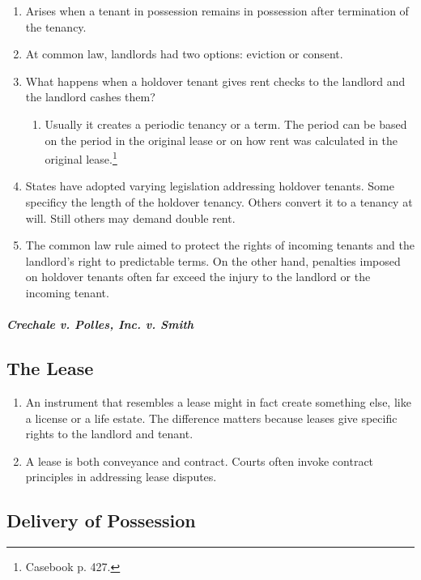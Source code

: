 \begin{enumerate}
    \item Arises when a tenant in possession remains in possession after 
    termination of the tenancy.
    \item At common law, landlords had two options: eviction or consent.
    \item What happens when a holdover tenant gives rent checks to the 
    landlord and the landlord cashes them?
    \begin{enumerate}
        \item Usually it creates a periodic tenancy or a term. The period can 
        be based on the period in the original lease or on how rent was 
        calculated in the original lease.\footnote{Casebook p. 427.}
    \end{enumerate}
    \item States have adopted varying legislation addressing holdover tenants. 
    Some specificy the length of the holdover tenancy. Others convert it to a 
    tenancy at will. Still others may demand double rent.
    \item The common law rule aimed to protect the rights of incoming tenants 
    and the landlord's right to predictable terms. On the other hand, 
    penalties imposed on holdover tenants often far exceed the injury to the 
    landlord or the incoming tenant.
\end{enumerate}

\paragraph{\emph{Crechale v. Polles, Inc. v. Smith}} 

\subsection{The Lease}

\begin{enumerate}
    \item An instrument that resembles a lease might in fact create something 
    else, like a license or a life estate. The difference matters because 
    leases give specific rights to the landlord and tenant.
    \item A lease is both conveyance and contract. Courts often invoke 
    contract principles in addressing lease disputes.
\end{enumerate}

\subsection{Delivery of Possession}

